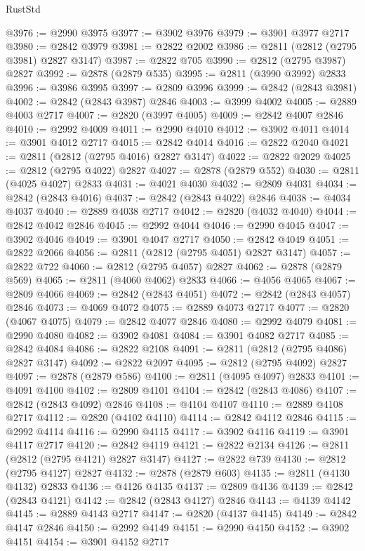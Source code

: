 \begin{lexlean}{RustStd}
\begin{coremodule}
{\begin{coremodule}
{{{{{{{{{{{{{{{{{{{{{{{{{{{{{{{{{@3976 := @2990 @3975
@3977 := @3902 @3976
@3979 := @3901 @3977 @2717
@3980 := @2842 @3979
@3981 := @2822 @2002
@3986 := @2811 (@2812 (@2795 @3981) @2827 @3147)
@3987 := @2822 @705
@3990 := @2812 (@2795 @3987) @2827
@3992 := @2878 (@2879 @535)
@3995 := @2811 (@3990 @3992) @2833
@3996 := @3986 @3995
@3997 := @2809 @3996
@3999 := @2842 (@2843 @3981)
@4002 := @2842 (@2843 @3987) @2846
@4003 := @3999 @4002
@4005 := @2889 @4003 @2717
@4007 := @2820 (@3997 @4005)
@4009 := @2842 @4007 @2846
@4010 := @2992 @4009
@4011 := @2990 @4010
@4012 := @3902 @4011
@4014 := @3901 @4012 @2717
@4015 := @2842 @4014
@4016 := @2822 @2040
@4021 := @2811 (@2812 (@2795 @4016) @2827 @3147)
@4022 := @2822 @2029
@4025 := @2812 (@2795 @4022) @2827
@4027 := @2878 (@2879 @552)
@4030 := @2811 (@4025 @4027) @2833
@4031 := @4021 @4030
@4032 := @2809 @4031
@4034 := @2842 (@2843 @4016)
@4037 := @2842 (@2843 @4022) @2846
@4038 := @4034 @4037
@4040 := @2889 @4038 @2717
@4042 := @2820 (@4032 @4040)
@4044 := @2842 @4042 @2846
@4045 := @2992 @4044
@4046 := @2990 @4045
@4047 := @3902 @4046
@4049 := @3901 @4047 @2717
@4050 := @2842 @4049
@4051 := @2822 @2066
@4056 := @2811 (@2812 (@2795 @4051) @2827 @3147)
@4057 := @2822 @722
@4060 := @2812 (@2795 @4057) @2827
@4062 := @2878 (@2879 @569)
@4065 := @2811 (@4060 @4062) @2833
@4066 := @4056 @4065
@4067 := @2809 @4066
@4069 := @2842 (@2843 @4051)
@4072 := @2842 (@2843 @4057) @2846
@4073 := @4069 @4072
@4075 := @2889 @4073 @2717
@4077 := @2820 (@4067 @4075)
@4079 := @2842 @4077 @2846
@4080 := @2992 @4079
@4081 := @2990 @4080
@4082 := @3902 @4081
@4084 := @3901 @4082 @2717
@4085 := @2842 @4084
@4086 := @2822 @2108
@4091 := @2811 (@2812 (@2795 @4086) @2827 @3147)
@4092 := @2822 @2097
@4095 := @2812 (@2795 @4092) @2827
@4097 := @2878 (@2879 @586)
@4100 := @2811 (@4095 @4097) @2833
@4101 := @4091 @4100
@4102 := @2809 @4101
@4104 := @2842 (@2843 @4086)
@4107 := @2842 (@2843 @4092) @2846
@4108 := @4104 @4107
@4110 := @2889 @4108 @2717
@4112 := @2820 (@4102 @4110)
@4114 := @2842 @4112 @2846
@4115 := @2992 @4114
@4116 := @2990 @4115
@4117 := @3902 @4116
@4119 := @3901 @4117 @2717
@4120 := @2842 @4119
@4121 := @2822 @2134
@4126 := @2811 (@2812 (@2795 @4121) @2827 @3147)
@4127 := @2822 @739
@4130 := @2812 (@2795 @4127) @2827
@4132 := @2878 (@2879 @603)
@4135 := @2811 (@4130 @4132) @2833
@4136 := @4126 @4135
@4137 := @2809 @4136
@4139 := @2842 (@2843 @4121)
@4142 := @2842 (@2843 @4127) @2846
@4143 := @4139 @4142
@4145 := @2889 @4143 @2717
@4147 := @2820 (@4137 @4145)
@4149 := @2842 @4147 @2846
@4150 := @2992 @4149
@4151 := @2990 @4150
@4152 := @3902 @4151
@4154 := @3901 @4152 @2717
}}}}}}}}}}}}}}}}}}}}}}}}}}}}}}}}}
\end{coremodule}}
\end{coremodule}
\end{lexlean}

